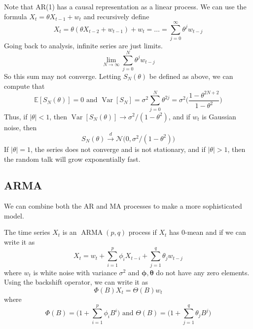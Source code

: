 \documentclass{article}
\DeclareMathOperator{\ARMA}{ARMA}
\DeclareMathOperator{\Var}{Var}
\begin{document}
  \begin{example}
    Note that AR(1) has a causal representation as a linear process. We can use the formula $X_t = \theta X_{t-1} + w_t$ and recursively define 
    \begin{equation}
      X_t = \theta(\theta X_{t-2} + w_{t-1}) + w_t = \ldots = \sum_{j=0}^\infty \theta^j w_{t-j}
    \end{equation}
    Going back to analysis, infinite series are just limits. 
    \begin{equation}
      \lim_{N \rightarrow \infty} \sum_{j=0}^N \theta^j w_{t-j} 
    \end{equation}
    So this sum may not converge. Letting $S_N (\theta)$ be defined as above, we can compute that 
    \begin{equation}
      \mathbb{E}[ S_N (\theta)] = 0 \text{ and } \Var[S_N] = \sigma^2 \sum_{j=0}^N \theta^{2j} = \sigma^2 \bigg( \frac{1 - \theta^{2N + 2}}{1 - \theta^2}\bigg)
    \end{equation}
    Thus, if $|\theta| < 1$, then $\Var[S_N (\theta)] \rightarrow \sigma^2 / (1 - \theta^2)$, and if $w_t$ is Gaussian noise, then 
    \begin{equation}
      S_N (\theta) \xrightarrow{d} \mathcal{N} \big( 0, \sigma^2 / (1 - \theta^2) \big)
    \end{equation}
    If $|\theta| = 1$, the series does not converge and is not stationary, and if $|\theta| > 1$, then the random talk will grow exponentially fast. 
  \end{example}

\subsection{ARMA}

  We can combine both the AR and MA processes to make a more sophisticated model. 

  \begin{definition}[ARMA]
    The time series $X_t$ is an $\ARMA(p, q)$ process if $X_t$ has $0$-mean and if we can write it as 
    \begin{equation}
      X_t = w_t + \sum_{i=1}^p \phi_i X_{t-i} + \sum_{j=1}^q \theta_j w_{t-j}
    \end{equation}
    where $w_t$ is white noise with variance $\sigma^2$ and $\boldsymbol{\phi}, \boldsymbol{\theta}$ do not have any zero elements. Using the backshift operator, we can write it as 
    \begin{equation}
      \Phi(B) X_t = \Theta(B) w_t
    \end{equation}
    where 
    \begin{equation}
      \Phi(B) = \bigg( 1 + \sum_{i=1}^p \phi_i B^i \bigg) \text{ and } \Theta(B) = \bigg( 1 + \sum_{j=1}^q \theta_j B^j \bigg)
    \end{equation}
  \end{definition}
\end{document}
